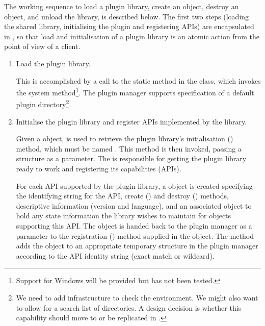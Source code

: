 \documentclass{article}
\newcommand{\OsiTwoControl}{\pgmid{Osi2::ControlAPI}\xspace}
\begin{document}
The working sequence to load a plugin library, create an object, destroy an
object, and unload the library, is described below.
The first two steps (loading the shared library, initialising the plugin and
registering APIs) are encapsulated in , so
that load and initialisation of a plugin library is an atomic action from the
point of view of a client.
\begin{enumerate}
  \item
  Load the plugin library.

  This is accomplished by a call to the static 
  method in the  class, which invokes the system
   method\footnote{%
      Support for Windows will be provided but has not been tested.}.
  The plugin manager supports specification of a default plugin
  directory\footnote{%
    We need to add infrastructure to check the environment. We might also
    want to allow for a search list of directories.
    A design decision is whether this capability should move to
    \OsiTwoControl or be replicated in \OsiTwoControl.}.

  \item
  Initialise the plugin library and register APIs implemented by the library.

  Given a  object,  is used to
  retrieve the plugin library's initialisation () method,
  which must be named .
  This method is then invoked,
  passing a  structure as a parameter.
  The  is responsible
  for getting the plugin library ready to work and registering
  its capabilities (APIs).

  For each API supported by the plugin library, a  object
  is created specifying the identifying string for the API, create
  () and destroy () methods,
  descriptive information (version and language), and an associated
  object to hold any state information the library wishes to maintain for
  objects supporting this API.
  The  object is handed back to the plugin manager
  as a parameter to the registration () method
  supplied in the  object.
  The  method adds the  object to
  an appropriate temporary structure in the plugin manager
  according to the API identity string (exact match or wildcard).


\end{enumerate}
\end{document}
